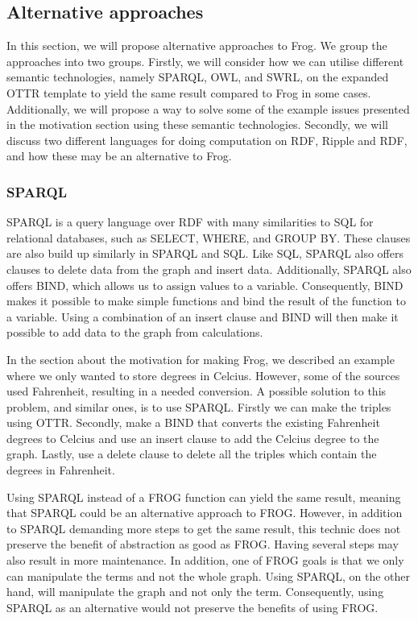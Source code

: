 \subsection{Alternative approaches}
In this section, we will propose alternative approaches to Frog.  We group the approaches into two groups.  Firstly, we will consider how we can utilise different semantic technologies, namely SPARQL, OWL, and SWRL,  on the expanded OTTR template to yield the same result compared to Frog in some cases. Additionally, we will propose a way to solve some of the example issues presented in the motivation section using these semantic technologies.  Secondly, we will discuss two different languages for doing computation on RDF, Ripple and RDF, and how these may be an alternative to Frog. 

\subsubsection{SPARQL}
SPARQL is a query language over RDF with many similarities to SQL for relational databases, such as SELECT, WHERE, and GROUP BY. These clauses are also build up similarly in SPARQL and SQL.  Like SQL, SPARQL also offers clauses to delete data from the graph and insert data. Additionally, SPARQL also offers BIND, which allows us to assign values to a variable. Consequently, BIND makes it possible to make simple functions and bind the result of the function to a variable. Using a combination of an insert clause and BIND will then make it possible to add data to the graph from calculations.

\para
In the section about the motivation for making Frog, we described an example where we only wanted to store degrees in Celcius. However, some of the sources used Fahrenheit, resulting in a needed conversion. A possible solution to this problem, and similar ones, is to use SPARQL. Firstly we can make the triples using OTTR. Secondly, make a BIND that converts the existing Fahrenheit degrees to Celcius and use an insert clause to add the Celcius degree to the graph. Lastly, use a delete clause to delete all the triples which contain the degrees in Fahrenheit.

\para
Using SPARQL instead of a FROG function can yield the same result, meaning that SPARQL could be an alternative approach to FROG. However, in addition to SPARQL demanding more steps to get the same result, this technic does not preserve the benefit of abstraction as good as FROG. Having several steps may also result in more maintenance. In addition, one of FROG goals is that we only can manipulate the terms and not the whole graph. Using SPARQL, on the other hand, will manipulate the graph and not only the term. Consequently, using SPARQL as an alternative would not preserve the benefits of using FROG.   



